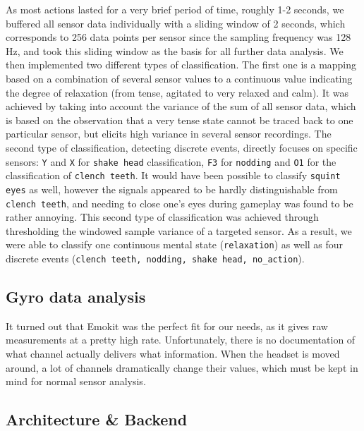 \documentclass{utue} %
\begin{document}
As most actions lasted for a very brief period of time, roughly 1-2 seconds, we buffered all sensor data individually with a sliding window of 2 seconds, which corresponds to 256 data points per sensor since the sampling frequency was 128 Hz, and took this sliding window as the basis for all further data analysis. We then implemented two different types of classification. The first one is a mapping based on a combination of several sensor values to a continuous value indicating the degree of relaxation (from tense, agitated to very relaxed and calm). It was achieved by taking into account the variance of the sum of all sensor data, which is based on the observation that a very tense state cannot be traced back to one particular sensor, but elicits high variance in several sensor recordings. The second type of classification, detecting discrete events, directly focuses on specific sensors: 
\texttt{Y} and \texttt{X} for \texttt{shake head} classification, \texttt{F3} for \texttt{nodding} and \texttt{O1} for the classification of \texttt{clench teeth}. It would have been possible to classify \texttt{squint eyes} as well, however the signals appeared to be hardly distinguishable from \texttt{clench teeth}, and needing to close one's eyes during gameplay was found to be rather annoying. This second type of classification was achieved through thresholding the windowed sample variance of a targeted sensor. As a result, we were able to classify one continuous mental state (\texttt{relaxation}) as well as four discrete events (\texttt{clench teeth, nodding, shake head, no\_action}).

\subsection{Gyro data analysis}

It turned out that Emokit was the perfect fit for our needs, as it gives raw measurements at a pretty high rate. Unfortunately, there is no documentation of what channel actually delivers what information. When the headset is moved around, a lot of channels dramatically change their values, which must be kept in mind for normal sensor analysis. 


\subsection{Architecture \& Backend}
\end{document}
